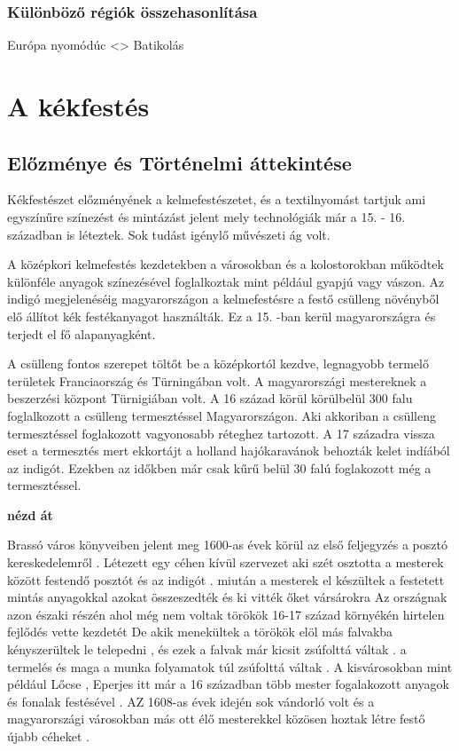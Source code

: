 \documentclass[fontsize=12pt, appendixprefix=true]{scrreprt}
\begin{document}
\subsection{Különböző régiók összehasonlítása}
   Európa nyomódúc <> Batikolás

\chapter{A kékfestés}
\section{Előzménye és Történelmi áttekintése}
Kékfestészet előzményének a kelmefestészetet, és a textilnyomást tartjuk ami egyszínűre színezést és mintázást jelent mely technológiák már a 15. - 16. században is léteztek. Sok tudást igénylő művészeti ág volt.

A középkori kelmefestés kezdetekben a városokban és a kolostorokban működtek különféle anyagok színezésével foglalkoztak mint például gyapjú vagy vászon. 
Az indigó megjelenéséig magyarországon a kelmefestésre a festő csülleng növényből elő állítot kék festékanyagot használták. Ez a 15. -ban kerül magyarországra és terjedt el fő alapanyagként.

A csülleng fontos szerepet töltőt be a középkortól kezdve, legnagyobb termelő területek Franciaország és Türningában volt. A magyarországi mestereknek a beszerzési központ Türnigiában volt.
A 16 század körül körülbelül 300 falu foglalkozott a csülleng termesztéssel Magyarországon. Aki akkoriban a csülleng termesztéssel foglakozott vagyonosabb réteghez tartozott. A 17 századra vissza eset a termesztés mert ekkortájt a holland hajókaravánok behozták kelet indíából az indigót.
Ezekben az időkben már csak kűrű belül 30 falú foglakozott még a termesztéssel.

\textbf{nézd át}

Brassó város könyveiben jelent meg 1600-as  évek körül  az első feljegyzés   a posztó kereskedelemről .
Létezett  egy céhen kívül szervezet aki szét osztotta a mesterek között festendő  posztót és az indigót .
 miután a mesterek el készültek a festetett mintás anyagokkal azokat összeszedték és ki vitték őket vársárokra 
Az országnak azon északi részén ahol még nem voltak törökök 16-17 század környékén hirtelen fejlődés vette kezdetét 
De akik menekültek a törökök elöl más falvakba kényszerültek le telepedni , és ezek a falvak már kicsit zsúfolttá váltak .
a termelés és maga a munka folyamatok túl zsúfolttá váltak    .
A kisvárosokban mint például Lőcse , Eperjes itt már a 16 században több mester  fogalakozott anyagok és fonalak  festésével  .
AZ 1608-as évek idején sok vándorló volt és a magyarországi városokban más ott élő mesterekkel közösen hoztak létre festő újabb céheket .
\end{document}
